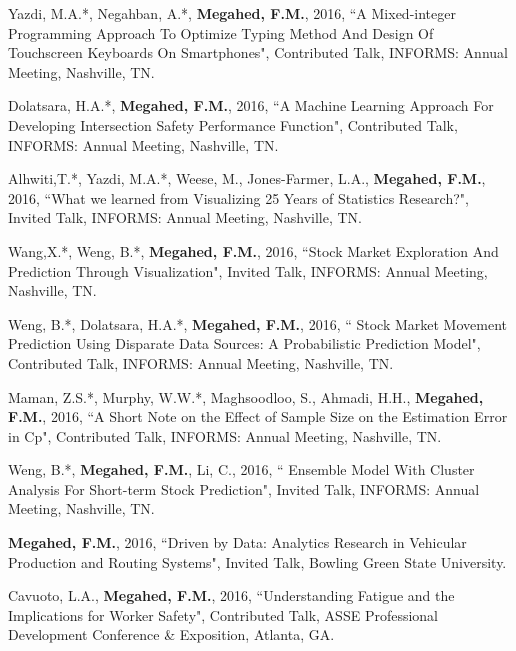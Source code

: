 \documentclass[margin,line]{res}
\begin{document}
\begin{resume}
\vspace{-1.5mm}
Yazdi, M.A.*, Negahban, A.*, \textbf{Megahed, F.M.}, 2016, ``A Mixed-integer Programming Approach To Optimize Typing Method And Design Of Touchscreen Keyboards On Smartphones", Contributed Talk, INFORMS: Annual Meeting, Nashville, TN.

\vspace{-1.5mm}
Dolatsara, H.A.*, \textbf{Megahed, F.M.}, 2016, ``A Machine Learning Approach For Developing Intersection Safety Performance Function", Contributed Talk, INFORMS: Annual Meeting, Nashville, TN.

\vspace{-1.5mm}
Alhwiti,T.*, Yazdi, M.A.*, Weese, M., Jones-Farmer, L.A., \textbf{Megahed, F.M.}, 2016, ``What we learned from Visualizing 25 Years of Statistics Research?", Invited Talk, INFORMS: Annual Meeting, Nashville, TN.

\vspace{-1.5mm}
Wang,X.*, Weng, B.*, \textbf{Megahed, F.M.}, 2016, ``Stock Market Exploration And Prediction Through Visualization", Invited Talk, INFORMS: Annual Meeting, Nashville, TN.

\vspace{-1.5mm}
Weng, B.*, Dolatsara, H.A.*, \textbf{Megahed, F.M.}, 2016, `` Stock Market Movement Prediction Using Disparate Data Sources: A Probabilistic Prediction Model", Contributed Talk, INFORMS: Annual Meeting, Nashville, TN.

\vspace{-1.5mm}
Maman, Z.S.*, Murphy, W.W.*, Maghsoodloo, S., Ahmadi, H.H., \textbf{Megahed, F.M.}, 2016, ``A Short Note on the Effect of Sample Size on the Estimation Error in Cp", Contributed Talk, INFORMS: Annual Meeting, Nashville, TN.

\vspace{-1.5mm}
Weng, B.*, \textbf{Megahed, F.M.}, Li, C., 2016, `` Ensemble Model With Cluster Analysis For Short-term Stock Prediction", Invited Talk, INFORMS: Annual Meeting, Nashville, TN.

\vspace{-1.5mm}
\textbf{Megahed, F.M.}, 2016, ``Driven by Data: Analytics Research in Vehicular Production and Routing Systems", Invited Talk, Bowling Green State University.

\vspace{-1.5mm}
Cavuoto, L.A., \textbf{Megahed, F.M.}, 2016, ``Understanding Fatigue and the Implications for Worker Safety", Contributed Talk, ASSE Professional Development Conference \& Exposition, Atlanta, GA.


\end{resume}
\end{document}
